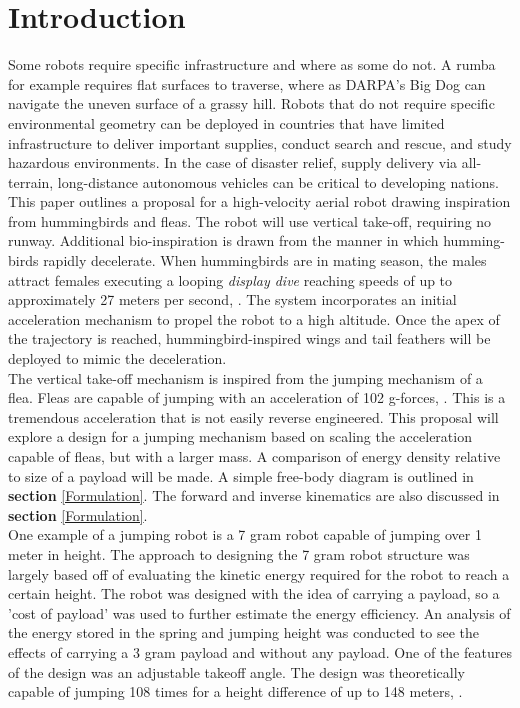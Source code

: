 \section{Introduction}
\label{intro}

\indent Some robots require specific infrastructure and where as some do not. A rumba for example requires flat surfaces to traverse, where as DARPA's Big Dog can navigate the uneven surface of a grassy hill. Robots that do not require specific environmental geometry can be deployed in countries that have limited infrastructure to deliver important supplies, conduct search and rescue, and study hazardous environments. In the case of disaster relief, supply delivery via all-terrain, long-distance autonomous vehicles can be critical to developing nations.\\

\indent This paper outlines a proposal for a high-velocity aerial robot drawing
inspiration from hummingbirds and fleas. The robot will use vertical take-off, requiring no runway. Additional bio-inspiration is drawn from the manner in which humming-birds rapidly decelerate. When hummingbirds are in mating season, the males attract females executing a looping \textit{display dive} reaching speeds of up to approximately 27 meters per second, \cite{bennet-clark_jump_nodate}. The system incorporates an initial acceleration mechanism to propel the robot to a high altitude. Once the apex of the trajectory is reached, hummingbird-inspired wings and tail feathers will be deployed to mimic the deceleration.\\

\indent The vertical take-off mechanism is inspired from the jumping mechanism of a flea. Fleas are capable of jumping with an acceleration of 102 g-forces, \cite[p.~62]{bennet-clark_jump_nodate}. This is a tremendous acceleration that is not easily reverse engineered. This proposal will explore a design for a jumping mechanism based on scaling the acceleration capable of fleas, but with a larger mass. A comparison of energy density relative to size of a payload will be made. A simple free-body diagram is outlined in \textbf{section} \ref{Formulation}. The forward and inverse kinematics are also discussed in \textbf{section} \ref{Formulation}.\\

\indent One example of a jumping robot is a 7 gram robot capable of jumping over 1 meter in height. The approach to designing the 7 gram robot structure was largely based off of evaluating the kinetic energy required for the robot to reach a certain height. The robot was designed with the idea of carrying a payload, so a 'cost of payload' was used to further estimate the energy efficiency. An analysis of the energy stored in the spring and jumping height was conducted to see the effects of carrying a 3 gram payload and without any payload. One of the features of the design was an adjustable takeoff angle. The design was theoretically capable of jumping 108 times for a height difference of up to 148 meters, \cite{kovac_miniature_2008}. \\


